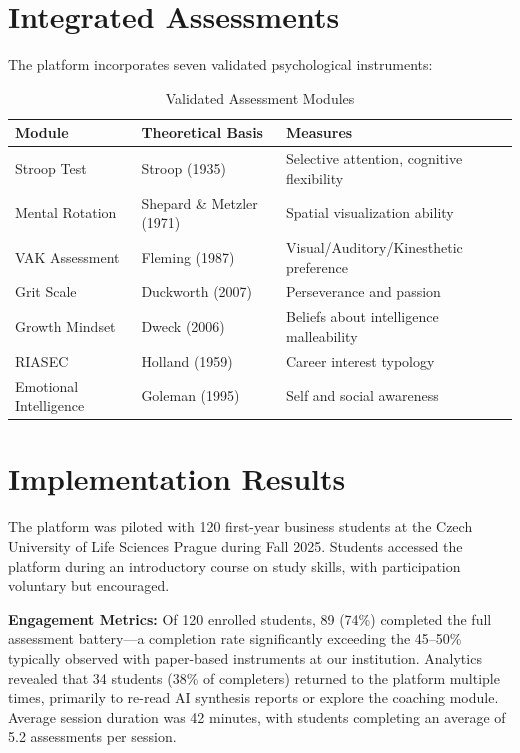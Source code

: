 \documentclass[11pt,a4paper]{article}
\begin{document}
\section{Integrated Assessments}

The platform incorporates seven validated psychological instruments:

\begin{table}[H]
\centering
\small
\begin{tabular}{@{}lll@{}}
\toprule
\textbf{Module} & \textbf{Theoretical Basis} & \textbf{Measures} \\
\midrule
Stroop Test & Stroop (1935) & Selective attention, cognitive flexibility \\
Mental Rotation & Shepard \& Metzler (1971) & Spatial visualization ability \\
VAK Assessment & Fleming (1987) & Visual/Auditory/Kinesthetic preference \\
Grit Scale & Duckworth (2007) & Perseverance and passion \\
Growth Mindset & Dweck (2006) & Beliefs about intelligence malleability \\
RIASEC & Holland (1959) & Career interest typology \\
Emotional Intelligence & Goleman (1995) & Self and social awareness \\
\bottomrule
\end{tabular}
\caption{Validated Assessment Modules}
\end{table}

\section{Implementation Results}

The platform was piloted with 120 first-year business students at the Czech University of Life Sciences Prague during Fall 2025. Students accessed the platform during an introductory course on study skills, with participation voluntary but encouraged.

\textbf{Engagement Metrics:} Of 120 enrolled students, 89 (74\%) completed the full assessment battery---a completion rate significantly exceeding the 45--50\% typically observed with paper-based instruments at our institution. Analytics revealed that 34 students (38\% of completers) returned to the platform multiple times, primarily to re-read AI synthesis reports or explore the coaching module. Average session duration was 42 minutes, with students completing an average of 5.2 assessments per session.
\end{document}

